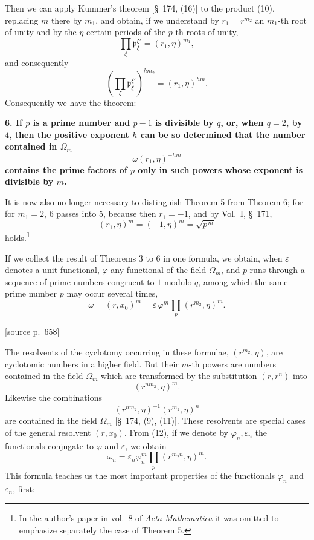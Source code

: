 \documentclass[11pt]{article}
\newcommand{\pp}{\mathfrak p}
\newcommand{\eps}{\varepsilon}
\newcommand{\srcpage}[1]{\par\medskip\noindent\textsf{[source p.~#1]}\par\smallskip}
\begin{document}
Then we can apply Kummer's theorem [\S~174, (16)] to the product (10), replacing $m$ there by $m_1$, and obtain, if we understand by $r_1=r^{m_2}$ an $m_1$-th root of unity and by the $\eta$ certain periods of the $p$-th roots of unity,
\[
  \prod_\xi \pp_\xi^{\xi'}=(r_1,\eta)^{m_1},
\]
and consequently
\begin{equation}
  \left(\prod_\xi \pp_\xi^{\xi'}\right)^{hm_2}=(r_1,\eta)^{hm}.
\tag{11}
\end{equation}
Consequently we have the theorem:

\textbf{6. If $p$ is a prime number and $p-1$ is divisible by $q$, or, when $q=2$, by $4$, then the positive exponent $h$ can be so determined that the number contained in $\Omega_m$}
\[
  \omega(r_1,\eta)^{-hm}
\]
\textbf{contains the prime factors of $p$ only in such powers whose exponent is divisible by $m$.}

It is now also no longer necessary to distinguish Theorem 5 from Theorem 6; for for $m_1=2$, 6 passes into 5, because then $r_1=-1$, and by Vol.~I, \S~171,
\[
  (r_1,\eta)^m=(-1,\eta)^m=\sqrt{p^{\,m}}
\]
holds.\footnote{In the author's paper in vol.~8 of \textit{Acta Mathematica} it was omitted to emphasize separately the case of Theorem 5.}

If we collect the result of Theorems 3 to 6 in one formula, we obtain, when $\eps$ denotes a unit functional, $\varphi$ any functional of the field $\Omega_m$, and $p$ runs through a sequence of prime numbers congruent to $1$ modulo $q$, among which the same prime number $p$ may occur several times,
\begin{equation}
  \omega=(r,x_0)^m=\eps\,\varphi^m\prod_p (r^{m_2},\eta)^m.
\tag{12}
\end{equation}

\srcpage{658}
The resolvents of the cyclotomy occurring in these formulae, $(r^{m_2},\eta)$, are cyclotomic numbers in a higher field. But their $m$-th powers are numbers contained in the field $\Omega_m$ which are transformed by the substitution $(r,r^n)$ into
\[
  (r^{n m_2},\eta)^m.
\]
Likewise the combinations
\begin{equation}
  (r^{n m_2},\eta)^{-1}(r^{m_2},\eta)^n
\tag{13}
\end{equation}
are contained in the field $\Omega_m$ [\S~174, (9), (11)]. These resolvents are special cases of the general resolvent $(r,x_0)$. From (12), if we denote by $\varphi_n,\eps_n$ the functionals conjugate to $\varphi$ and $\eps$, we obtain
\begin{equation}
  \omega_n=\eps_n\varphi_n^m\prod_p (r^{m_2n},\eta)^m.
\tag{14}
\end{equation}
This formula teaches us the most important properties of the functionals $\varphi_n$ and $\eps_n$, first:
\end{document}
